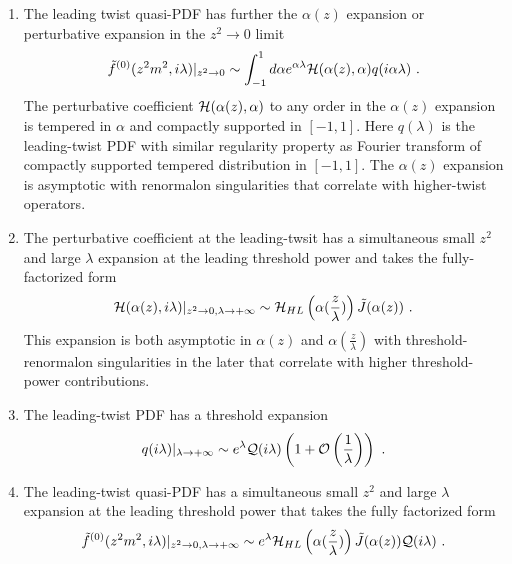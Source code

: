 \documentclass[a4paper,11pt]{article}
\begin{document}
\begin{enumerate}
   In the small $z^2$ limit, the quasi-PDF has a well-defined twist-expansion:
    \begin{align}
    \tilde f(z^2m^2,i\lambda)=\sum_{l=0}^{\infty}(z^2m^2)^l\tilde f^{(l)}(z^2m^2,i\lambda)\ .
    \end{align}
    For any fixed $\lambda$, this expansion has a infinite convergence radius in $z^2$.
    \item The leading twist quasi-PDF has further the $\alpha(z)$ expansion or perturbative expansion in the $z^2\rightarrow 0$ limit
    \begin{align}
    \tilde f^{(0)}(z^2m^2,i\lambda)|_{z^2\rightarrow 0}\sim \int_{-1}^1 d\alpha e^{\alpha \lambda}{\cal H}(\alpha(z),\alpha)q(i\alpha \lambda) \ .
    \end{align}
    The perturbative coefficient ${\cal H}(\alpha(z),\alpha)$ to any order in the $\alpha(z)$ expansion is tempered in $\alpha$ and compactly supported in $[-1,1]$. 
    Here $q(\lambda)$ is the leading-twist PDF with similar regularity property as Fourier transform of compactly supported tempered distribution in $[-1,1]$.
    The $\alpha(z)$ expansion is asymptotic with renormalon singularities that correlate with higher-twist operators.
    \item The perturbative coefficient at the leading-twsit has a simultaneous small $z^2$ and large $\lambda$ expansion at the leading threshold power and takes the fully-factorized form
    \begin{align}
    {\cal H}(\alpha(z),i\lambda)|_{z^2 \rightarrow 0, \lambda \rightarrow +\infty} \sim {\cal H}_{HL} \left(\alpha(\frac{z}{\lambda})\right)\tilde J(\alpha(z)) \ .
    \end{align}
    This expansion is both asymptotic in $\alpha(z)$ and $\alpha(\frac{z}{\lambda})$ with threshold-renormalon singularities in the later that correlate with higher threshold-power contributions. 
    \item The leading-twist PDF has a threshold expansion 
    \begin{align}
    q(i\lambda)|_{\lambda \rightarrow +\infty} \sim e^{\lambda} {\cal Q}(i\lambda)\left(1+{\cal O}\left(\frac{1}{\lambda}\right)\right) \ .
    \end{align}
    \item The leading-twist quasi-PDF has a simultaneous small $z^2$ and large $\lambda$ expansion at the leading threshold power that takes the fully factorized form
    \begin{align}
    \tilde f^{(0)}(z^2m^2,i\lambda)|_{z^2\rightarrow 0,\lambda \rightarrow +\infty}\sim e^{\lambda} {\cal H}_{HL} \left(\alpha(\frac{z}{\lambda})\right)\tilde J(\alpha(z)){\cal Q}(i\lambda) \ .
    \end{align}
\end{enumerate}
\end{document}
